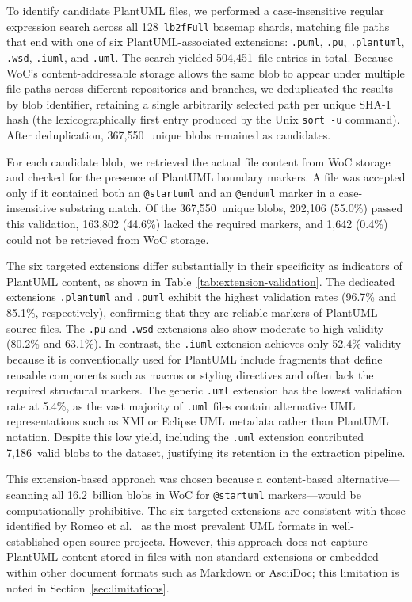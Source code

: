 \documentclass[11pt]{article}
\begin{document}
To identify candidate PlantUML files, we performed a case-insensitive regular expression search across all 128~\texttt{lb2fFull} basemap shards, matching file paths that end with one of six PlantUML-associated extensions: \texttt{.puml}, \texttt{.pu}, \texttt{.plantuml}, \texttt{.wsd}, \texttt{.iuml}, and \texttt{.uml}. The search yielded 504,451~file entries in total. Because WoC's content-addressable storage allows the same blob to appear under multiple file paths across different repositories and branches, we deduplicated the results by blob identifier, retaining a single arbitrarily selected path per unique SHA-1 hash (the lexicographically first entry produced by the Unix \texttt{sort~-u} command). After deduplication, 367,550~unique blobs remained as candidates.

For each candidate blob, we retrieved the actual file content from WoC storage and checked for the presence of PlantUML boundary markers. A file was accepted only if it contained both an \texttt{@startuml} and an \texttt{@enduml} marker in a case-insensitive substring match. Of the 367,550~unique blobs, 202,106 (55.0\%) passed this validation, 163,802 (44.6\%) lacked the required markers, and 1,642 (0.4\%) could not be retrieved from WoC storage.

The six targeted extensions differ substantially in their specificity as indicators of PlantUML content, as shown in Table~\ref{tab:extension-validation}. The dedicated extensions \texttt{.plantuml} and \texttt{.puml} exhibit the highest validation rates (96.7\% and 85.1\%, respectively), confirming that they are reliable markers of PlantUML source files. The \texttt{.pu} and \texttt{.wsd} extensions also show moderate-to-high validity (80.2\% and 63.1\%). In contrast, the \texttt{.iuml} extension achieves only 52.4\% validity because it is conventionally used for PlantUML include fragments that define reusable components such as macros or styling directives and often lack the required structural markers. The generic \texttt{.uml} extension has the lowest validation rate at 5.4\%, as the vast majority of \texttt{.uml} files contain alternative UML representations such as XMI or Eclipse UML metadata rather than PlantUML notation. Despite this low yield, including the \texttt{.uml} extension contributed 7,186~valid blobs to the dataset, justifying its retention in the extraction pipeline.

This extension-based approach was chosen because a content-based alternative---scanning all 16.2~billion blobs in WoC for \texttt{@startuml} markers---would be computationally prohibitive. The six targeted extensions are consistent with those identified by Romeo et al.~\cite{romeo2025uml} as the most prevalent UML formats in well-established open-source projects. However, this approach does not capture PlantUML content stored in files with non-standard extensions or embedded within other document formats such as Markdown or AsciiDoc; this limitation is noted in Section~\ref{sec:limitations}.
\end{document}
